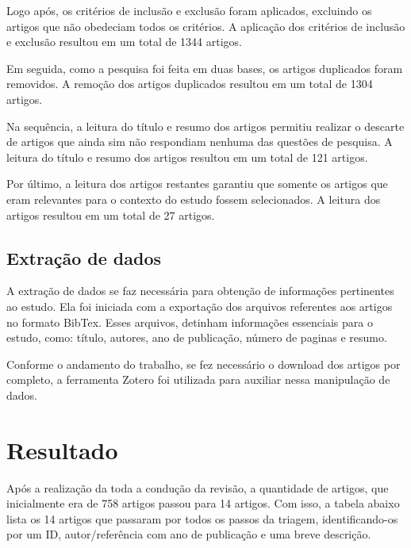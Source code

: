 Logo após, os critérios de inclusão e exclusão foram aplicados, excluindo os artigos que não obedeciam todos os critérios. A aplicação dos critérios de inclusão e exclusão resultou em um total de 1344 artigos.

Em seguida, como a pesquisa foi feita em duas bases, os artigos duplicados foram removidos. A remoção dos artigos duplicados resultou em um total de 1304 artigos.

Na sequência, a leitura do título e resumo dos artigos permitiu realizar o descarte de artigos que ainda sim não respondiam nenhuma das questões de pesquisa. A leitura do título e resumo dos artigos resultou em um total de 121 artigos.

Por último, a leitura dos artigos restantes garantiu que somente os artigos que eram relevantes para o contexto do estudo fossem selecionados. A leitura dos artigos resultou em um total de 27 artigos.

\subsection{Extração de dados}

A extração de dados se faz necessária para obtenção de informações pertinentes ao estudo. Ela foi iniciada com a exportação dos arquivos referentes aos artigos no formato BibTex. Esses arquivos, detinham informações essenciais para o estudo, como: título, autores, ano de publicação, número de paginas e resumo.

Conforme o andamento do trabalho, se fez necessário o download dos artigos por completo, a ferramenta Zotero foi utilizada para auxiliar nessa manipulação de dados.

\section{Resultado}

Após a realização da toda a condução da revisão, a quantidade de artigos, que inicialmente era de 758 artigos passou para 14 artigos. Com isso, a tabela abaixo lista os 14 artigos que passaram por todos os passos da triagem, identificando-os por um ID, autor/referência com ano de publicação e uma breve descrição. 

